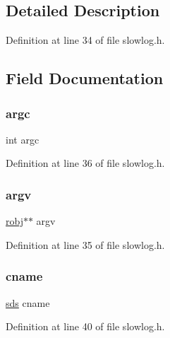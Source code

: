 \subsection{Detailed Description}


Definition at line 34 of file slowlog.\+h.



\subsection{Field Documentation}
\mbox{\label{structslowlog_entry_ad1447518f4372828b8435ae82e48499e}} 
\subsubsection{\texorpdfstring{argc}{argc}}
{\footnotesize\ttfamily int argc}



Definition at line 36 of file slowlog.\+h.

\mbox{\label{structslowlog_entry_a5c75dd3cb8eb8a3f5be7d4fdf48a9ef9}} 
\subsubsection{\texorpdfstring{argv}{argv}}
{\footnotesize\ttfamily \hyperlink{server_8h_a540f174d2685422fbd7d12e3cd44c8e2}{robj}$\ast$$\ast$ argv}



Definition at line 35 of file slowlog.\+h.

\mbox{\label{structslowlog_entry_a8075cc6220751389639cec9aec6d9195}} 
\subsubsection{\texorpdfstring{cname}{cname}}
{\footnotesize\ttfamily \hyperlink{sds_8h_ad69abac3df4532879db9642c95f5ef6f}{sds} cname}



Definition at line 40 of file slowlog.\+h.

